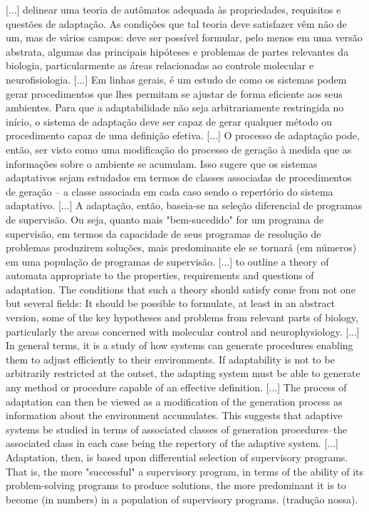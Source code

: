 \citacao
	{%
		[...] delinear uma teoria de autômatos adequada às propriedades, requisitos e questões de adaptação. As condições que tal teoria deve satisfazer vêm não de um, mas de vários campos: deve ser possível formular, pelo menos em uma versão abstrata, algumas das principais hipóteses e problemas de partes relevantes da biologia, particularmente as áreas relacionadas ao controle molecular e neurofisiologia. [...] Em linhas gerais, é um estudo de como os sistemas podem gerar procedimentos que lhes permitam se ajustar de forma eficiente aos seus ambientes. Para que a adaptabilidade não seja arbitrariamente restringida no início, o sistema de adaptação deve ser capaz de gerar qualquer método ou procedimento capaz de uma definição efetiva. [...] O processo de adaptação pode, então, ser visto como uma modificação do processo de geração à medida que as informações sobre o ambiente se acumulam. Isso sugere que os sistemas adaptativos sejam estudados em termos de classes associadas de procedimentos de geração – a classe associada em cada caso sendo o repertório do sistema adaptativo. [...] A adaptação, então, baseia-se na seleção diferencial de programas de supervisão. Ou seja, quanto mais "bem-sucedido" for um programa de supervisão, em termos da capacidade de seus programas de resolução de problemas produzirem soluções, mais predominante ele se tornará (em números) em uma população de programas de supervisão.
	}{%
		[...] to outline a theory of automata appropriate to the properties, requirements and questions of adaptation. The conditions that such a theory should satisfy come from not one but several fields: It should be possible to formulate, at least in an abstract version, some of the key hypotheses and problems from relevant parts of biology, particularly the areas concerned with molecular control and neurophysiology. [...] In general terms, it is a study of how systems can generate procedures enabling them to adjust efficiently to their environments. If adaptability is not to be arbitrarily restricted at the outset, the adapting system must be able to generate any method or procedure capable of an effective definition. [...] The process of adaptation can then be viewed as a modification of the generation process as information about the environment accumulates. This suggests that adaptive systems be studied in terms of associated classes of generation procedures--the associated class in each case being the repertory of the adaptive system. [...] Adaptation, then, is based upon differential selection of supervisory programs. That is, the more "successful" a supervisory program, in terms of the ability of its problem-solving programs to produce solutions, the more predominant it is to become (in numbers) in a population of supervisory programs.
	}
	{\citep[p.297-298]{holland_1962}}
	{(tradução nossa).}

